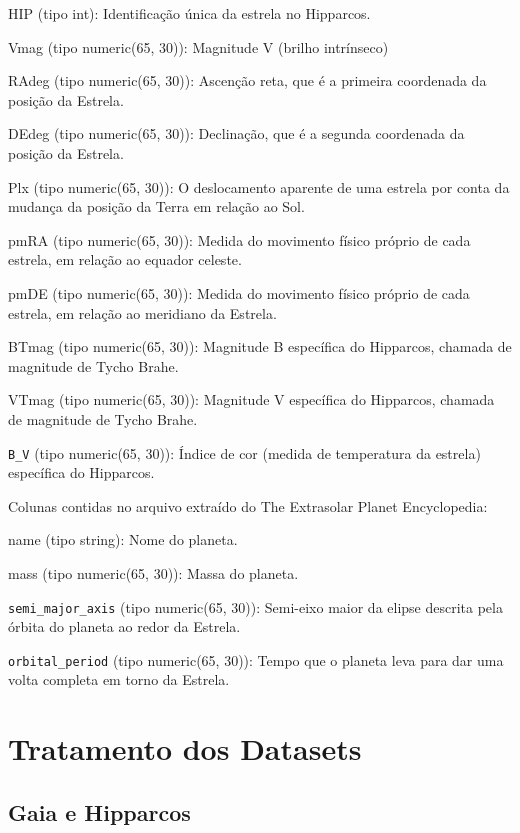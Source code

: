 \documentclass[12pt, a4paper]{article}
\begin{document}
	HIP (tipo int):
	Identificação única da estrela no Hipparcos.
	
	Vmag (tipo numeric(65, 30)):
	Magnitude V (brilho intrínseco) 
	
	RAdeg (tipo numeric(65, 30)):
	Ascenção reta, que é a primeira coordenada da posição da Estrela.
	
	DEdeg (tipo numeric(65, 30)):
	Declinação, que é a segunda coordenada da posição da Estrela.
	
	Plx (tipo numeric(65, 30)):
	O deslocamento aparente de uma estrela por conta da mudança da posição da Terra em relação ao Sol.
	
	pmRA (tipo numeric(65, 30)):
	Medida do movimento físico próprio de cada estrela, em relação ao equador celeste.
	
	pmDE (tipo numeric(65, 30)):
	Medida do movimento físico próprio de cada estrela, em relação ao meridiano da Estrela.
	
	BTmag (tipo numeric(65, 30)):
	Magnitude B específica do Hipparcos, chamada de magnitude de Tycho Brahe.
	
	VTmag (tipo numeric(65, 30)):
	Magnitude V específica do Hipparcos, chamada de magnitude de Tycho Brahe.
	
	\verb|B_V| (tipo numeric(65, 30)):
	Índice de cor (medida de temperatura da estrela) específica do Hipparcos.
	
	Colunas contidas no arquivo extraído do The Extrasolar Planet Encyclopedia:
	
	name (tipo string):
	Nome do planeta.
	
	mass (tipo numeric(65, 30)):
	Massa do planeta.
	
	\verb|semi_major_axis| (tipo numeric(65, 30)):
	Semi-eixo maior da elipse descrita pela órbita do planeta ao redor da Estrela.
	
	\verb|orbital_period| (tipo numeric(65, 30)): 
	Tempo que o planeta leva para dar uma volta completa em torno da Estrela.
	
	\section{Tratamento dos Datasets}
	
	\subsection{Gaia e Hipparcos}
	
\end{document}
